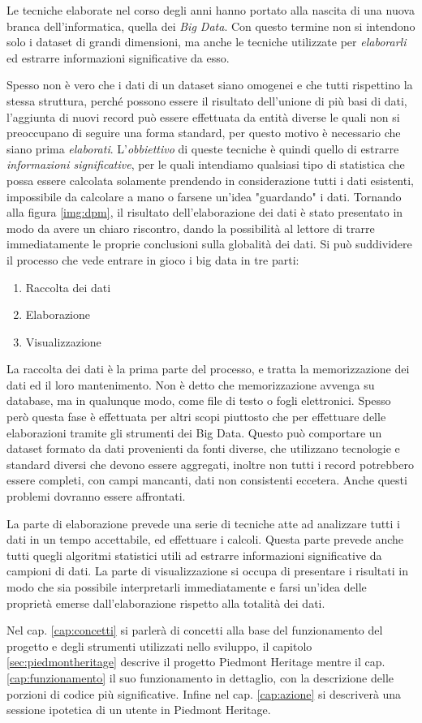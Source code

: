 Le tecniche elaborate nel corso degli anni hanno portato alla nascita di una nuova branca dell'informatica, quella dei \emph{Big Data}. Con questo termine non si intendono solo i dataset di grandi dimensioni, ma anche le tecniche utilizzate per \emph{elaborarli} ed estrarre informazioni significative da esso. 

Spesso non è vero che i dati di un dataset siano omogenei e che tutti rispettino la stessa struttura, perché possono essere il risultato dell'unione di più basi di dati, l'aggiunta di nuovi record può essere effettuata da entità diverse le quali non si preoccupano di seguire una forma standard, per questo motivo è necessario che siano prima \emph{elaborati}. L'\emph{obbiettivo} di queste tecniche è quindi quello di estrarre \emph{informazioni significative}, per le quali intendiamo qualsiasi tipo di statistica che possa essere calcolata solamente prendendo in considerazione tutti i dati esistenti, impossibile da calcolare a mano o farsene un'idea "guardando" i dati. Tornando alla figura \ref{img:dpm}, il risultato dell'elaborazione dei dati è stato presentato in modo da avere un chiaro riscontro, dando la possibilità al lettore di trarre immediatamente le proprie conclusioni sulla globalità dei dati.
Si può suddividere il processo che vede entrare in gioco i big data in tre parti:
\begin{enumerate}\label{sec:puntibd}
\item Raccolta dei dati
\item Elaborazione
\item Visualizzazione
\end{enumerate}
La raccolta dei dati è la prima parte del processo, e tratta la memorizzazione dei dati ed il loro mantenimento. Non è detto che memorizzazione avvenga su database, ma in qualunque modo, come file di testo o fogli elettronici. Spesso però questa fase è effettuata per altri scopi piuttosto che per effettuare delle elaborazioni tramite gli strumenti dei Big Data. Questo può comportare un dataset formato da dati provenienti da fonti diverse, che utilizzano tecnologie e standard diversi che devono essere aggregati, inoltre non tutti i record potrebbero essere completi, con campi mancanti, dati non consistenti eccetera. Anche questi problemi dovranno essere affrontati.

La parte di elaborazione prevede una serie di tecniche atte ad analizzare tutti i dati in un tempo accettabile, ed effettuare i calcoli. Questa parte prevede anche tutti quegli algoritmi statistici utili ad estrarre informazioni significative da campioni di dati.
La parte di visualizzazione si occupa di presentare i risultati in modo che sia possibile interpretarli immediatamente e farsi un'idea delle proprietà emerse dall'elaborazione rispetto alla totalità dei dati.

Nel cap. \ref{cap:concetti} si parlerà di concetti alla base del funzionamento del progetto e degli strumenti utilizzati nello sviluppo, il capitolo \ref{sec:piedmontheritage} descrive il progetto Piedmont Heritage mentre il cap. \ref{cap:funzionamento} il suo funzionamento in dettaglio, con la descrizione delle porzioni di codice più significative. Infine nel cap. \ref{cap:azione} si descriverà una sessione ipotetica di un utente in Piedmont Heritage.
